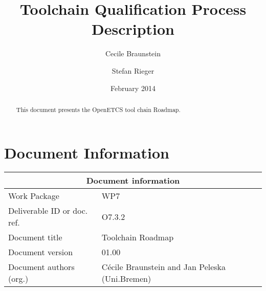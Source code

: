 \documentclass{openetcs_report}
\begin{document}
\frontmatter
{}




\title{Toolchain Qualification Process Description}


\date{February 2014}


\author{Cecile Braunstein \and Stefan Rieger}







\begin{abstract}
This document presents the OpenETCS tool chain Roadmap.
\end{abstract}


\maketitle
\tableofcontents

\newpage

\chapter{Document Information}

\begin{tabular}{|p{4.4cm}|p{8.7cm}|}
\hline
\multicolumn{2}{|c|}{Document information} \\
\hline
Work Package &  WP7  \\
Deliverable ID or doc. ref. & O7.3.2\\
\hline
Document title & Toolchain Roadmap \\
Document version & 01.00 \\
Document authors (org.)  & Cécile Braunstein and Jan Peleska (Uni.Bremen) \\
\hline
\end{tabular}
\end{document}
